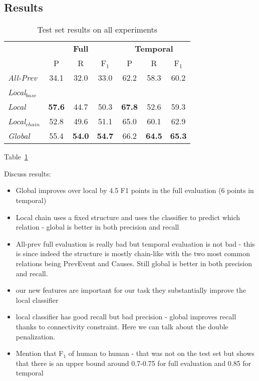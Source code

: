\subsection{Results}

\begin{table}[t]
{\footnotesize
\begin{tabular}{| l | c | c | c | c | c | c |}
\hline
    & \multicolumn{3}{c|}{\textbf{Full}} & \multicolumn{3}{c|}{\textbf{Temporal}} \\
    & P & R & F$_1$ & P & R & F$_1$ \\
\hline
\hline
\emph{All-Prev} & 34.1 & 32.0 & 33.0 & 62.2 & 58.3 & 60.2 \\
\emph{Local$_{base}$} & & & & & & \\
\emph{Local} & \textbf{57.6} & 44.7 & 50.3 & \textbf{67.8} & 52.6 & 59.3 \\
\emph{Local$_{chain}$} & 52.8 & 49.6  & 51.1 & 65.0 & 60.1 & 62.9\\
\emph{Global} & 55.4 & \textbf{54.0} & \textbf{54.7} & 66.2 & \textbf{64.5} & \textbf{65.3} \\
\hline
\end{tabular}}
\caption{Test set results on all experiments}
\label{tab:results}
\end{table}
Table~\ref{tab:results}

Discuss results:
\begin{itemize}
\item Global improves over local by 4.5 F1 points in the full evaluation (6 points in temporal)
\item Local chain uses a fixed structure and uses the classifier to predict which relation - global is better in both precision and recall
\item All-prev full evaluation is really bad but temporal evaluation is not bad - this is since indeed the structure is mostly chain-like with the two most common relations being PrevEvent and Causes. Still global is better in both precision and recall. 
\item our new features are important for our task they substantially improve the local classifier
\item local classifier has good recall but bad precision - global improves recall thanks to connectivity constraint. Here we can talk about the double penalization.
\item Mention that F$_1$ of human to human - that was not on the test set but shows that there is an upper bound around 0.7-0.75 for full evaluation and 0.85 for temporal
\end{itemize}

